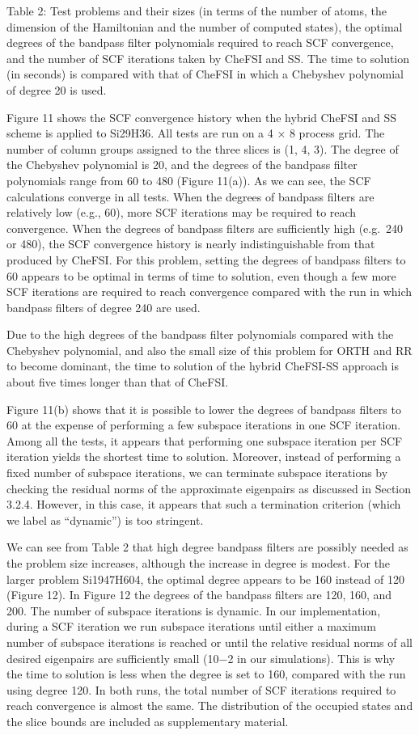 \documentclass[
  10
]{article}
\begin{document}
Table 2: Test problems and their sizes (in terms of the number of atoms,
the dimension of the Hamiltonian and the number of computed states), the
optimal degrees of the bandpass filter polynomials required to reach SCF
convergence, and the number of SCF iterations taken by CheFSI and SS.
The time to solution (in seconds) is compared with that of CheFSI in
which a Chebyshev polynomial of degree 20 is used.

Figure 11 shows the SCF convergence history when the hybrid CheFSI and
SS scheme is applied to Si29H36. All tests are run on a 4 × 8 process
grid. The number of column groups assigned to the three slices is (1, 4,
3). The degree of the Chebyshev polynomial is 20, and the degrees of the
bandpass filter polynomials range from 60 to 480 (Figure 11(a)). As we
can see, the SCF calculations converge in all tests. When the degrees of
bandpass filters are relatively low (e.g., 60), more SCF iterations may
be required to reach convergence. When the degrees of bandpass filters
are sufficiently high (e.g.~240 or 480), the SCF convergence history is
nearly indistinguishable from that produced by CheFSI. For this problem,
setting the degrees of bandpass filters to 60 appears to be optimal in
terms of time to solution, even though a few more SCF iterations are
required to reach convergence compared with the run in which bandpass
filters of degree 240 are used.

Due to the high degrees of the bandpass filter polynomials compared with
the Chebyshev polynomial, and also the small size of this problem for
ORTH and RR to become dominant, the time to solution of the hybrid
CheFSI-SS approach is about five times longer than that of CheFSI.

Figure 11(b) shows that it is possible to lower the degrees of bandpass
filters to 60 at the expense of performing a few subspace iterations in
one SCF iteration. Among all the tests, it appears that performing one
subspace iteration per SCF iteration yields the shortest time to
solution. Moreover, instead of performing a fixed number of subspace
iterations, we can terminate subspace iterations by checking the
residual norms of the approximate eigenpairs as discussed in Section
3.2.4. However, in this case, it appears that such a termination
criterion (which we label as ``dynamic'') is too stringent.

We can see from Table 2 that high degree bandpass filters are possibly
needed as the problem size increases, although the increase in degree is
modest. For the larger problem Si1947H604, the optimal degree appears to
be 160 instead of 120 (Figure 12). In Figure 12 the degrees of the
bandpass filters are 120, 160, and 200. The number of subspace
iterations is dynamic. In our implementation, during a SCF iteration we
run subspace iterations until either a maximum number of subspace
iterations is reached or until the relative residual norms of all
desired eigenpairs are sufficiently small (10−2 in our simulations).
This is why the time to solution is less when the degree is set to 160,
compared with the run using degree 120. In both runs, the total number
of SCF iterations required to reach convergence is almost the same. The
distribution of the occupied states and the slice bounds are included as
supplementary material.
\end{document}
